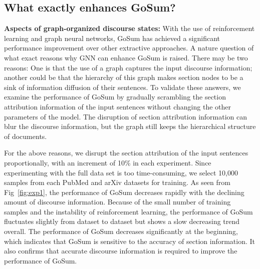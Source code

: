\subsection{What exactly enhances GoSum?}
\noindent \textbf{Aspects of graph-organized discourse states:}
With the use of reinforcement learning and graph neural networks, GoSum has achieved a significant performance improvement over other extractive approaches.
A nature question of what exact reasons why GNN can enhance GoSum is raised. There may be two reasons:
One is that the use of a graph captures the input discourse information; another could be that the hierarchy of this graph makes  section nodes to be a sink of information diffusion of their sentences.
To validate these answers, we examine the  performance of GoSum by gradually scrambling the section attribution information of the input sentences without changing the other parameters of the model. The disruption of section attribution information can blur the discourse information, but the graph still keeps the hierarchical structure of documents.

For the above reasons, we disrupt the section attribution of the input sentences proportionally, with an increment of 10\% in each experiment.
Since experimenting with the full data set is too time-consuming, we select 10,000 samples from each PubMed and arXiv datasets for training.
As seen from  Fig~\ref{fig:exp1}, the performance of GoSum decreases rapidly with the declining amount of discourse information.
Because of the small number of training samples and the instability of reinforcement learning, the performance of GoSum fluctuates slightly from dataset to dataset but shows a slow decreasing trend overall.
The performance of GoSum decreases significantly at the beginning, which indicates that GoSum is sensitive to the accuracy of section information. It also confirms that accurate discourse information is required to improve the performance of GoSum.

